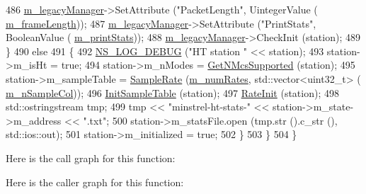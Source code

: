 \begin{DoxyCode}
486           \hyperlink{classns3_1_1MinstrelHtWifiManager_ae10ffd948e46a60593b1aef80372082a}{m\_legacyManager}->SetAttribute (\textcolor{stringliteral}{"PacketLength"}, UintegerValue (
      \hyperlink{classns3_1_1MinstrelHtWifiManager_a069e6a4b77dc080d720a4b076cd8d7c5}{m\_frameLength}));
487           \hyperlink{classns3_1_1MinstrelHtWifiManager_ae10ffd948e46a60593b1aef80372082a}{m\_legacyManager}->SetAttribute (\textcolor{stringliteral}{"PrintStats"}, BooleanValue (
      \hyperlink{classns3_1_1MinstrelHtWifiManager_a0e2d19e84336ab6d788afd81a6ba9cdb}{m\_printStats}));
488           \hyperlink{classns3_1_1MinstrelHtWifiManager_ae10ffd948e46a60593b1aef80372082a}{m\_legacyManager}->CheckInit (station);
489         \}
490       \textcolor{keywordflow}{else}
491         \{
492           \hyperlink{group__logging_ga413f1886406d49f59a6a0a89b77b4d0a}{NS\_LOG\_DEBUG} (\textcolor{stringliteral}{"HT station "} << station);
493           station->m\_isHt = \textcolor{keyword}{true};
494           station->m\_nModes = \hyperlink{classns3_1_1WifiRemoteStationManager_a3b4fd7e5c50dfe3270831ad38de180e9}{GetNMcsSupported} (station);
495           station->m\_sampleTable = \hyperlink{namespacens3_a6f9a56ecdb723c09bd5ab4f3b57a5bb5}{SampleRate} (\hyperlink{classns3_1_1MinstrelHtWifiManager_a2f3d0e7f6c298a40dbc8699805103142}{m\_numRates}, std::vector<uint32\_t> (
      \hyperlink{classns3_1_1MinstrelHtWifiManager_afc2db9ea273b3599cb09ccbf73f866e0}{m\_nSampleCol}));
496           \hyperlink{classns3_1_1MinstrelHtWifiManager_a073d213169fe62c797ceb92ad999dcb0}{InitSampleTable} (station);
497           \hyperlink{classns3_1_1MinstrelHtWifiManager_a3b59b889db624539c6d5af89fa5e9f74}{RateInit} (station);
498           std::ostringstream tmp;
499           tmp << \textcolor{stringliteral}{"minstrel-ht-stats-"} << station->m\_state->m\_address << \textcolor{stringliteral}{".txt"};
500           station->m\_statsFile.open (tmp.str ().c\_str (), std::ios::out);
501           station->m\_initialized = \textcolor{keyword}{true};
502         \}
503     \}
504 \}
\end{DoxyCode}


Here is the call graph for this function\+:




Here is the caller graph for this function\+:


